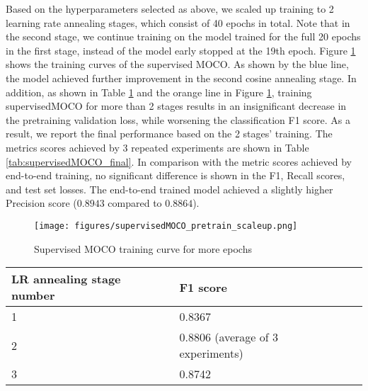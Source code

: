 \documentclass[12pt,twoside]{report}
\begin{document}
Based on the hyperparameters selected as above, we scaled up training to 2 learning rate annealing stages, which consist of 40 epochs in total. Note that in the second stage, we continue training on the model trained for the full 20 epochs in the first stage, instead of the model early stopped at the 19th epoch. Figure \ref{fig:supervisedMOCO_pretraining_final_curve} shows the training curves of the supervised MOCO. As shown by the blue line, the model achieved further improvement in the second cosine annealing stage. In addition, as shown in Table \ref{tab:supervisedMOCO_multistage} and the orange line in Figure \ref{fig:supervisedMOCO_pretraining_final_curve}, training supervisedMOCO for more than 2 stages results in an insignificant decrease in the pretraining validation loss, while worsening the classification F1 score. As a result, we report the final performance based on the 2 stages' training. The metrics scores achieved by 3 repeated experiments are shown in Table \ref{tab:supervisedMOCO_final}. In comparison with the metric scores achieved by end-to-end training, no significant difference is shown in the F1, Recall scores, and test set losses. The end-to-end trained model achieved a slightly higher Precision score ($0.8943$ compared to $0.8864$). \\

\begin{figure}
    \centering
    \texttt{[image: figures/supervisedMOCO\_pretrain\_scaleup.png]}
    \caption{Supervised MOCO training curve for more epochs}
    \label{fig:supervisedMOCO_pretraining_final_curve}
\end{figure}

\begin{table}[]
    \centering
    \begin{tabular}{lll}
    \toprule
    LR annealing stage number & F1 score \\
    \midrule
    1 & 0.8367 \\
    2 & 0.8806 (average of 3 experiments) \\
    3 & 0.8742 \\
    \bottomrule
    \end{tabular}
    \captionsetup{type=table}
    \label{tab:supervisedMOCO_multistage}
\end{table}
\end{document}

